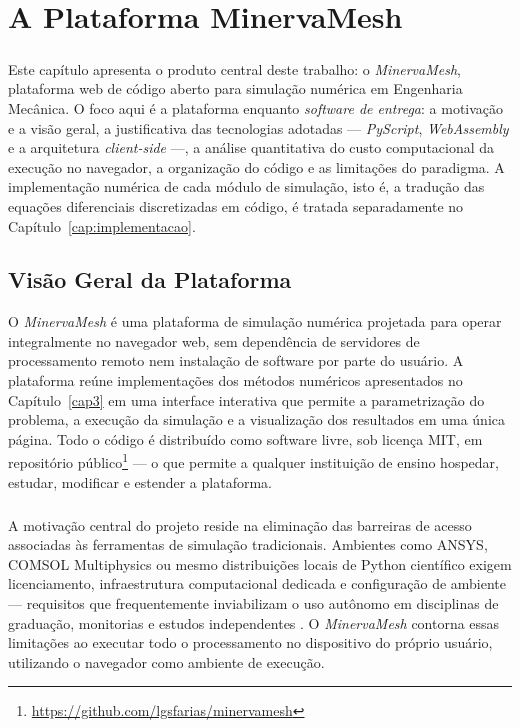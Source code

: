 \chapter{A Plataforma MinervaMesh}
\label{cap:plataforma}

\paragraph{}Este capítulo apresenta o produto central deste trabalho: o \textit{MinervaMesh}, plataforma web de código aberto para simulação numérica em Engenharia Mecânica. O foco aqui é a plataforma enquanto \emph{software de entrega}: a motivação e a visão geral, a justificativa das tecnologias adotadas --- \textit{PyScript}, \textit{WebAssembly} e a arquitetura \textit{client-side} ---, a análise quantitativa do custo computacional da execução no navegador, a organização do código e as limitações do paradigma. A implementação numérica de cada módulo de simulação, isto é, a tradução das equações diferenciais discretizadas em código, é tratada separadamente no Capítulo~\ref{cap:implementacao}.

\section{Visão Geral da Plataforma}
\label{sec:visao_geral}

O \textit{MinervaMesh} é uma plataforma de simulação numérica projetada para operar integralmente no navegador web, sem dependência de servidores de processamento remoto nem instalação de software por parte do usuário. A plataforma reúne implementações dos métodos numéricos apresentados no Capítulo~\ref{cap3} em uma interface interativa que permite a parametrização do problema, a execução da simulação e a visualização dos resultados em uma única página. Todo o código é distribuído como software livre, sob licença MIT, em repositório público\footnote{\url{https://github.com/lgsfarias/minervamesh}} --- o que permite a qualquer instituição de ensino hospedar, estudar, modificar e estender a plataforma.

\paragraph{}A motivação central do projeto reside na eliminação das barreiras de acesso associadas às ferramentas de simulação tradicionais. Ambientes como ANSYS, COMSOL Multiphysics ou mesmo distribuições locais de Python científico exigem licenciamento, infraestrutura computacional dedicada e configuração de ambiente --- requisitos que frequentemente inviabilizam o uso autônomo em disciplinas de graduação, monitorias e estudos independentes \cite{Anjos2024}. O \textit{MinervaMesh} contorna essas limitações ao executar todo o processamento no dispositivo do próprio usuário, utilizando o navegador como ambiente de execução.

